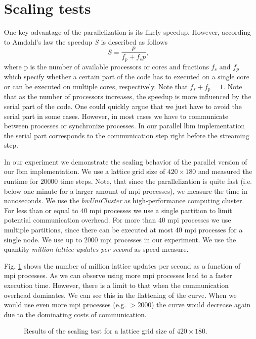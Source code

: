 \documentclass[a4paper,11pt, footsepline]{book}
\begin{document}
\section{Scaling tests}\label{sec-scaling}
One key advantage of the parallelization is its likely speedup. However, according to Amdahl's law \cite{Amdahl.1967} the speedup $S$ is described as follows
\begin{equation}
S=\frac{p}{f_{p}+f_{s}p},
\end{equation}
where p is the number of available processors or cores and fractions $f_{s}$ and $f_{p}$ which specify whether a certain part of the code has to executed on a single core or can be executed on multiple cores, respectively. Note that $f_{s}+f_{p}=1$. Note that as the number of processors increases, the speedup is more influenced by the serial part of the code. One could quickly argue that we just have to avoid the serial part in some cases. However, in most cases we have to communicate between processes or synchronize processes. In our parallel \ac{lbm} implementation the serial part corresponds to the communication step right before the streaming step.

In our experiment we demonstrate the scaling behavior of the parallel version of our \ac{lbm} implementation. We use a lattice grid size of $420\times 180$ and measured the runtime for $20000$ time steps. Note, that since the parallelization is quite fast (i.e. below one minute for a larger amount of \ac{mpi} processes), we measure the time in nanoseconds. We use the \textit{bwUniCluster} as high-performance computing cluster. For less than or equal to $40$ \ac{mpi} processes we use a single partition to limit potential communication overhead. For more than $40$ \ac{mpi} processes we use multiple partitions, since there can be executed at most $40$ \ac{mpi} processes for a single node. We use up to $2000$ \ac{mpi} processes in our experiment. We use the quantity \textit{million lattice updates per second} as speed measure.

Fig. \ref{fig:scaling_test} shows the number of million lattice updates per second as a function of \ac{mpi} processes. As we can observe using more \ac{mpi} processes lead to a faster execution time. However, there is a limit to that when the communication overhead dominates. We can see this in the flattening of the curve. When we would use even more \ac{mpi} processes (e.g. $>2000$) the curve would decrease again due to the dominating costs of communication.
\begin{figure}
  \begin{center}
	\scalebox{0.7}{}
   \caption{Results of the scaling test for a lattice grid size of $420\times 180$.}
  \label{fig:scaling_test}
  \end{center}
\end{figure}
\end{document}
